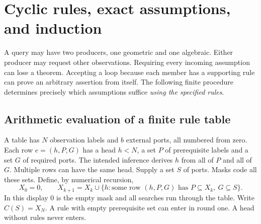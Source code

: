 \section{Cyclic rules, exact assumptions, and induction}
\label{sec:rules}
A query may have two producers, one geometric and one algebraic. Either producer may request other observations. Requiring every incoming assumption can lose a theorem. Accepting a loop because each member has a supporting rule can prove an arbitrary assertion from itself. The following finite procedure determines precisely which assumptions suffice \emph{using the specified rules}.

\subsection{Arithmetic evaluation of a finite rule table}
A table has $N$ observation labels and $b$ external ports, all numbered from zero. Each row $e=(h,P,G)$ has a head $h<N$, a set $P$ of prerequisite labels and a set $G$ of required ports. The intended inference derives $h$ from all of $P$ and all of $G$. Multiple rows can have the same head. Supply a set $S$ of ports. Masks code all these sets. Define, by numerical recursion,
\[
 X_0=0,\qquad
 X_{k+1}=X_k\cup
 \{h:\text{some row }(h,P,G)\text{ has }P\subseteq X_k,\ G\subseteq S\}.
\]
In this display $0$ is the empty mask and all searches run through the table. Write $C(S)=X_N$. A rule with empty prerequisite set can enter in round one. A head without rules never enters.

